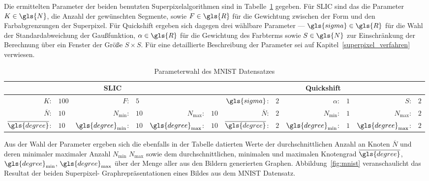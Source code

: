Die ermittelten Parameter \bzgl{} der beiden benutzten Superpixelalgorithmen sind in Tabelle~\ref{tab:mnist} gegeben.
Für \gls{SLIC} sind das die Parameter $K \in \gls{N}$, \dhe{} die Anzahl der gewünschten Segmente, sowie $F \in \gls{R}$ für die Gewichtung zwischen der Form und den Farbabgrenzungen der Superpixel.
Für Quickshift ergeben sich dagegen drei wählbare Parameter — $\gls{sigma} \in \gls{R}$ für die Wahl der Standardabweichung der Gaußfunktion, $\alpha \in \gls{R}$ für die Gewichtung des Farbterms sowie $S \in \gls{N}$ zur Einschränkung der Berechnung über ein Fenster der Größe $S \times S$.
Für eine detaillierte Beschreibung der Parameter sei auf Kapitel~\ref{superpixel_verfahren} verwiesen.
\begin{table}[htpb]
\centering
\begin{tabular}{rlrlrlrlrlrl}
  \toprule
  \multicolumn{6}{c}{\gls{SLIC}} & \multicolumn{6}{c}{Quickshift}\\
  \midrule
  $K$: & $100$ & $F$: & $5$ & & & $\gls{sigma}$: & $2$ & $\alpha$: & $1$ & $S$: & $2$\\
  \midrule
  $\overline{N}$: & $10$ & $N_{\min}$: & $10$ & $N_{\max}$: & $10$ & $\overline{N}$: & $2$ & $N_{\min}$: & $1$ & $N_{\max}$: & $2$\\
  $\overline{\gls{degree}}$: & $10$ & $\gls{degree}_{\min}$: & $10$ & $\gls{degree}_{\max}$: & $10$ & $\overline{\gls{degree}}$: & $2$ & $\gls{degree}_{\min}$: & $1$ & $\gls{degree}_{\max}$: & $2$\\
  \bottomrule
\end{tabular}
\caption[Parameterwahl des \gls{MNIST} Datensatzes]{Parameterwahl des \gls{MNIST} Datensatzes}
\label{tab:mnist}
\end{table}
Aus der Wahl der Parameter ergeben sich die ebenfalls in der Tabelle datierten Werte der durchschnittlichen Anzahl an Knoten $\overline{N}$ und deren minimaler \bzw{} maximaler Anzahl $N_{\min}$ \bzw{} $N_{\max}$ sowie dem durchschnittlichen, minimalen und maximalen Knotengrad $\overline{\gls{degree}}$, $\gls{degree}_{\min}$, $\gls{degree}_{\max}$ über der Menge aller aus den Bildern generierten Graphen.
Abbildung~\ref{fig:mnist} veranschaulicht das Resultat der beiden Superpixel- \bzw{} Graphrepräsentationen eines Bildes aus dem \gls{MNIST} Datensatz.





